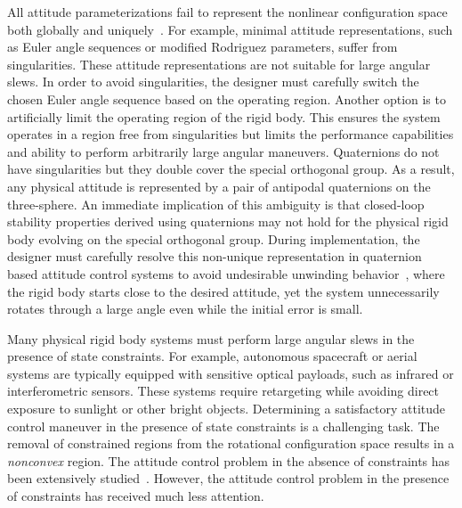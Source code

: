 \documentclass[letterpaper, 10 pt, conference]{ieeeconf}  %
\begin{document}
All attitude parameterizations fail to represent the nonlinear configuration space both globally and uniquely~\cite{chaturvedi2011a}.
For example, minimal attitude representations, such as Euler angle sequences or modified Rodriguez parameters, suffer from singularities.
These attitude representations are not suitable for large angular slews.
In order to avoid singularities, the designer must carefully switch the chosen Euler angle sequence based on the operating region.
Another option is to artificially limit the operating region of the rigid body.
This ensures the system operates in a region free from singularities but limits the performance capabilities and ability to perform arbitrarily large angular maneuvers.
Quaternions do not have singularities but they double cover the special orthogonal group.
As a result, any physical attitude is represented by a pair of antipodal quaternions on the three-sphere.
An immediate implication of this ambiguity is that closed-loop stability properties derived using quaternions may not hold for the physical rigid body evolving on the special orthogonal group.
During implementation, the designer must carefully resolve this non-unique representation in quaternion based attitude control systems to avoid undesirable unwinding behavior~\cite{bhat2000}, where the rigid body starts close to the desired attitude, yet the system unnecessarily rotates through a large angle even while the initial error is small.

Many physical rigid body systems must perform large angular slews in the presence of state constraints.
For example, autonomous spacecraft or aerial systems are typically equipped with sensitive optical payloads, such as infrared or interferometric sensors.
These systems require retargeting while avoiding direct exposure to sunlight or other bright objects.
Determining a satisfactory attitude control maneuver in the presence of state constraints is a challenging task.
The removal of constrained regions from the rotational configuration space results in a \textit{nonconvex} region.
The attitude control problem in the absence of constraints has been extensively studied~\cite{bullo2004,MayTeePaCC11,LEEITAC15}.
However, the attitude control problem in the presence of constraints has received much less attention.
\end{document}
